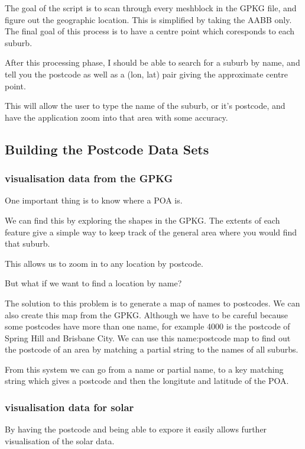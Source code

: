 \documentclass[12pt,a4paper]{report}
\begin{document}
The goal of the script is to scan through every meshblock in the GPKG file, and figure out the geographic location. This is simplified by taking the AABB only. The final goal of this process is to have a centre point which coresponds to each suburb.

After this processing phase, I should be able to search for a suburb by name, and tell you the postcode as well as a (lon, lat) pair giving the approximate centre point.

This will allow the user to type the name of the suburb, or it's postcode, and have the application zoom into that area with some accuracy. 

\subsection{Building the Postcode Data Sets}

\subsubsection{visualisation data from the GPKG}

One important thing is to know where a POA is.

We can find this by exploring the shapes in the GPKG. The extents of each feature give a simple way to keep track of the general area where you would find that suburb.

This allows us to zoom in to any location by postcode.

But what if we want to find a location by name?

The solution to this problem is to generate a map of names to postcodes. We can also create this map from the GPKG. Although we have to be careful because some postcodes have more than one name, for example 4000 is the postcode of Spring Hill and Brisbane City. We can use this name:postcode map to find out the postcode of an area by matching a partial string to the names of all suburbs.

From this system we can go from a name or partial name, to a key matching string which gives a postcode and then the longitute and latitude of the POA.

\subsubsection{visualisation data for solar}

By having the postcode and being able to expore it easily allows further visualisation of the solar data.
\end{document}
